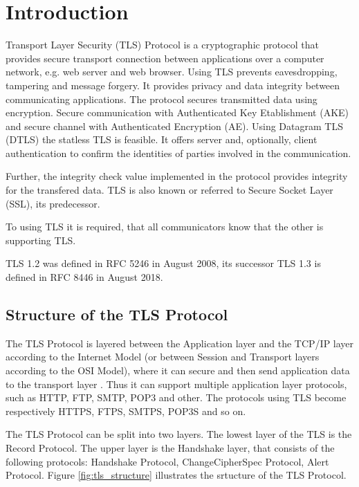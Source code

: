 \chapter{Introduction}
\label{chap:introduction}

Transport Layer Security (TLS) Protocol is a cryptographic protocol that provides secure transport connection between applications over a computer network, e.g. web server and web browser. 
 Using TLS prevents eavesdropping, tampering and message forgery. It provides privacy and data integrity between communicating applications. The protocol secures transmitted data using encryption. Secure communication with Authenticated Key Etablishment (AKE) and secure channel with Authenticated Encryption (AE). 
 Using Datagram TLS (DTLS) the statless TLS is feasible. It offers server and, optionally, client authentication to confirm the identities of parties involved in the communication. 
 
 Further, the integrity check value implemented in the protocol provides integrity for the transfered data. TLS is also known or referred to Secure Socket Layer (SSL), its predecessor. 
 
To using TLS it is required, that all communicators know that the other is supporting TLS.

TLS 1.2 was defined in RFC 5246 in August 2008, its successor TLS 1.3 is defined in RFC 8446 in August 2018.
 \cite{RFC5246}

\section{Structure of the TLS Protocol}
\label{sec:stucture}

The TLS Protocol is layered between the Application layer and the TCP/IP layer according to the Internet Model (or between Session and Transport layers according to the OSI Model), where it can secure and then send application data to the transport layer \cite{ms:overview}. Thus it can support multiple application layer protocols, such as HTTP, FTP, SMTP, POP3 and other. The protocols using TLS become respectively HTTPS, FTPS, SMTPS, POP3S and so on.

The TLS Protocol can be split into two layers. The lowest layer of the TLS is the Record Protocol. The upper layer is the Handshake layer, that consists of the following protocols: Handshake Protocol, ChangeCipherSpec Protocol, Alert Protocol. Figure \ref{fig:tls_structure} illustrates the srtucture of the TLS Protocol. 


